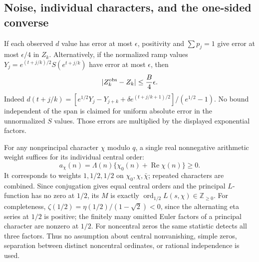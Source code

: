 \subsection{Noise, individual characters, and the one-sided converse}

If each observed $d$ value has error at most $\epsilon$, positivity and
$\sum p_j=1$ give error at most $\epsilon/4$ in $Z_k$. Alternatively,
if the normalized ramp values
$Y_j=e^{(t+j/k)/2}S(e^{t+j/k})$ have error at most $\epsilon$, then
\[
 |Z_k^{\rm obs}-Z_k|\le\frac B4\epsilon.
\]
Indeed
$d(t+j/k)=[e^{1/2}Y_j-Y_{j+k}+\delta e^{(t+j/k+1)/2}]/(e^{1/2}-1)$.
No bound independent of the span is claimed for uniform absolute error
in the unnormalized $S$ values. Those errors are multiplied by
the displayed exponential factors.

For any nonprincipal character $\chi$ modulo $q$, a single real
nonnegative arithmetic weight suffices for its individual central order:
\[
 a_\chi(n)=\Lambda(n)\{\chi_0(n)+\operatorname{Re}\chi(n)\}\ge0.
\]
It corresponds to weights $1,1/2,1/2$ on $\chi_0,\chi,\bar\chi$;
repeated characters are combined. Since conjugation gives equal central
orders and the principal $L$-function has no zero at $1/2$, its $M$ is
exactly $\operatorname{ord}_{1/2}L(s,\chi)\in\mathbb Z_{\ge0}$.
For completeness, $\zeta(1/2)=\eta(1/2)/(1-\sqrt2)<0$, since the
alternating eta series at $1/2$ is positive; the finitely many omitted
Euler factors of a principal character are nonzero at $1/2$.
For noncentral zeros the same statistic detects all three factors.
Thus no assumption about central nonvanishing, simple zeros, separation
between distinct noncentral ordinates, or rational independence is used.

